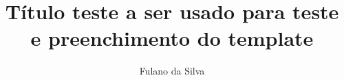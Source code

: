 
\newcommand{\HRule}{\rule{\linewidth}{0.5mm}}



\newcommand{\TITULOa}{\textbf{Estimativas de curvatura para sólitons de Ricci gradientes quadri-dimensionais e classificação de quase-sólitons de Ricci gradientes com curvatura harmônica}}



\newcommand{\TITULOb}{\textbf{Sobre sólitons de Ricci gradientes shrinking quadri-dimensionais e quase-sólitons de Ricci gradientes com curvatura harmônica}}


\newcommand{\TITULOc}{\textbf{Sobre estimativas de curvatura para sólitons de Ricci gradientes shrinking quadri-dimensionais e estrutura local de quase-sólitons de Ricci gradientes com curvatura harmônica}}

\newcommand{\TITULOfinal}{\textbf{Título teste a ser usado para teste e preenchimento do template}}


\title{\TITULOfinal}









\author{Fulano da Silva}








